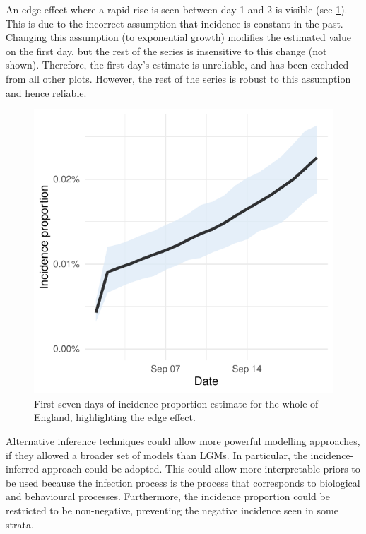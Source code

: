 \documentclass[thesis.tex]{subfiles}
\begin{document}
An edge effect where a rapid rise is seen between day 1 and 2 is visible (see \cref{transmission:fig:backcalc-start-effect}).
This is due to the incorrect assumption that incidence is constant in the past.
Changing this assumption (\eg to exponential growth) modifies the estimated value on the first day, but the rest of the series is insensitive to this change (not shown).
Therefore, the first day's estimate is unreliable, and has been excluded from all other plots.
However, the rest of the series is robust to this assumption and hence reliable.
\begin{figure}
    \centering \includegraphics{transmission/backcalc-start-effect}
    \caption[Edge effects in backcalculation method]{%
        First seven days of incidence proportion estimate for the whole of England, highlighting the edge effect.
    }
    \label{transmission:fig:backcalc-start-effect}
\end{figure}

Alternative inference techniques could allow more powerful modelling approaches, if they allowed a broader set of models than LGMs.
In particular, the incidence-inferred approach could be adopted.
This could allow more interpretable priors to be used because the infection process is the process that corresponds to biological and behavioural processes.
Furthermore, the incidence proportion could be restricted to be non-negative, preventing the negative incidence seen in some strata.
\end{document}
